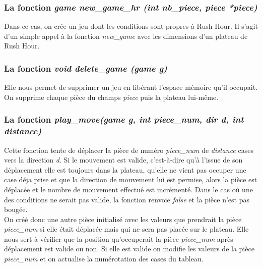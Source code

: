 \documentclass{report}
\begin{document}
\subsubsection{La fonction \textit{game new\_game\_hr (int nb\_piece, piece *piece)}}
Dans ce cas, on crée un jeu dont les conditions sont propres à Rush Hour.
Il s'agit d'un simple appel à la fonction \textit{new\_game} avec les dimensions d'un plateau de Rush Hour.
\subsubsection{La fonction \textit{void delete\_game (game g)}}
Elle nous permet de supprimer un jeu en libérant l'espace mémoire qu'il occupait. On supprime chaque pièce du champs \textit{piece} puis la plateau lui-même.
\subsubsection{La fonction \textit{play\_move(game g, int piece\_num, dir d, int distance)}}
Cette fonction tente de déplacer la pièce de numéro \textit{piece\_num} de \textit{distance} cases vers la direction \textit{d}. Si le mouvement est valide, c'est-à-dire qu'à l'issue de son déplacement elle est toujours dans la plateau, qu'elle ne vient pas occuper une case déja prise et que la direction de mouvement lui est permise, alors la pièce est déplacée et le nombre de mouvement effectué est incrémenté. Dans le cas où une des conditions ne serait pas valide, la fonction renvoie \textit{false} et la pièce n'est pas bougée.\\
On créé donc une autre pièce initialisé avec les valeurs que prendrait la pièce \textit{piece\_num} si elle était déplacée mais qui ne sera pas placée sur le plateau. Elle nous sert à vérifier que la position qu'occuperait la pièce \textit{piece\_num} après déplacement est valide ou non. Si elle est valide on modifie les valeurs de la pièce \textit{piece\_num} et on actualise la numérotation des cases du tableau.
\end{document}
